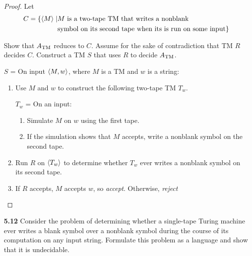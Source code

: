 \begin{mdframed}
\begin{proof}
Let 
\begin{align*}
C = \{ \langle{M}\rangle \mid &\text{$M$ is a two-tape TM that writes a nonblank} \\
& \text{symbol on its second tape when its is run on some input}\}
\end{align*}

Show that $A_{\text{TM}}$ reduces to $C$. Assume for the sake of contradiction that TM $R$ decides $C$. Construct a TM $S$ that uses $R$ to decide $A_{\text{TM}}$.

\medskip
$S$ = On input $\langle{M, w}\rangle$, where $M$ is a TM and $w$ is a string:
\begin{enumerate}
\item Use $M$ and $w$ to construct the following two-tape TM $T_w$.

$T_w$ = On an input:
\begin{enumerate}
\item Simulate $M$ on $w$ using the first tape.
\item If the simulation shows that $M$ accepts, write a nonblank symbol on the second tape.
\end{enumerate}
\item Run $R$ on $\langle{T_w}\rangle$ to determine whether $T_w$ ever writes a nonblank symbol on its second tape.
\item If $R$ accepts, $M$ accepts $w$, so \textit{accept}. Otherwise, \textit{reject}
\end{enumerate}
\end{proof}
\end{mdframed}

\textbf{5.12} Consider the problem of determining whether a single-tape Turing machine ever writes a blank symbol over a nonblank symbol during the course of its computation on any input string. Formulate this problem as a language and show that it is undecidable.

